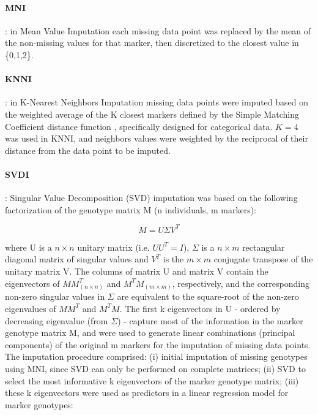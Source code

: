 \paragraph{MNI}
\label{par:MNI}
: in Mean Value Imputation each missing data point was replaced by the mean of the non-missing values for that marker, then discretized to the closest value in \{0,1,2\}.
\paragraph{KNNI}
\label{par:KNNI}
: in K-Nearest Neighbors Imputation missing data points were imputed based on the weighted average of the K closest markers \cite{troyanskaya_missing_2001} defined by the Simple Matching Coefficient distance function \cite{schwender_statistical_2007}, specifically designed for categorical data. $K=4$ was used in KNNI, and neighbors values were weighted by the reciprocal of their distance from the data point to be imputed.
\paragraph{SVDI}
\label{par:SVDI}
: Singular Value Decomposition (SVD) imputation was based on the following factorization of the genotype matrix M (n individuals, m markers):

\begin{equation}
\label{eq:SVDI_general}
M = U\Sigma V^{T}
\end{equation}

where U is a $n \times n$ unitary matrix (i.e. $UU^{T}=I$), $\Sigma$ is a $n \times m$ rectangular diagonal matrix of singular values and $V^{T}$ is the $m \times m$ conjugate transpose of the unitary matrix V. The columns of matrix U and matrix V contain the eigenvectors of $MM^{T}_{(n \times n)}$ and $M^{T}M_{(m \times m)}$, respectively, and the corresponding non-zero singular values in $\Sigma$ are equivalent to the square-root of the non-zero eigenvalues of $MM^{T}$ and $M^{T}M$. The first k eigenvectors in U - ordered by decreasing eigenvalue (from $\Sigma$) - capture most of the information in the marker genotype matrix M, and were used to generate linear combinations (principal components) of the original m markers for the imputation of missing data points. The imputation procedure comprised: (i) initial imputation of missing genotypes using MNI, since SVD can only be performed on complete matrices; (ii) SVD to select the most informative k eigenvectors of the marker genotype matrix; (iii) these k eigenvectors were used as predictors in a linear regression model for marker genotypes:

